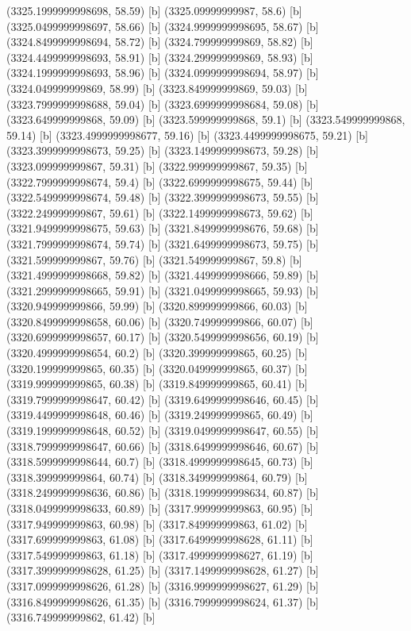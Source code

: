 {{{(3325.1999999998698, 58.59) [b] 
(3325.09999999987, 58.6) [b] 
(3325.0499999998697, 58.66) [b] 
(3324.9999999998695, 58.67) [b] 
(3324.8499999998694, 58.72) [b] 
(3324.799999999869, 58.82) [b] 
(3324.4499999998693, 58.91) [b] 
(3324.299999999869, 58.93) [b] 
(3324.1999999998693, 58.96) [b] 
(3324.0999999998694, 58.97) [b] 
(3324.049999999869, 58.99) [b] 
(3323.849999999869, 59.03) [b] 
(3323.7999999998688, 59.04) [b] 
(3323.6999999998684, 59.08) [b] 
(3323.649999999868, 59.09) [b] 
(3323.599999999868, 59.1) [b] 
(3323.549999999868, 59.14) [b] 
(3323.4999999998677, 59.16) [b] 
(3323.4499999998675, 59.21) [b] 
(3323.3999999998673, 59.25) [b] 
(3323.1499999998673, 59.28) [b] 
(3323.099999999867, 59.31) [b] 
(3322.999999999867, 59.35) [b] 
(3322.7999999998674, 59.4) [b] 
(3322.6999999998675, 59.44) [b] 
(3322.5499999998674, 59.48) [b] 
(3322.3999999998673, 59.55) [b] 
(3322.249999999867, 59.61) [b] 
(3322.1499999998673, 59.62) [b] 
(3321.9499999998675, 59.63) [b] 
(3321.8499999998676, 59.68) [b] 
(3321.7999999998674, 59.74) [b] 
(3321.6499999998673, 59.75) [b] 
(3321.599999999867, 59.76) [b] 
(3321.549999999867, 59.8) [b] 
(3321.4999999998668, 59.82) [b] 
(3321.4499999998666, 59.89) [b] 
(3321.2999999998665, 59.91) [b] 
(3321.0499999998665, 59.93) [b] 
(3320.949999999866, 59.99) [b] 
(3320.899999999866, 60.03) [b] 
(3320.8499999998658, 60.06) [b] 
(3320.749999999866, 60.07) [b] 
(3320.6999999998657, 60.17) [b] 
(3320.5499999998656, 60.19) [b] 
(3320.4999999998654, 60.2) [b] 
(3320.399999999865, 60.25) [b] 
(3320.199999999865, 60.35) [b] 
(3320.049999999865, 60.37) [b] 
(3319.999999999865, 60.38) [b] 
(3319.849999999865, 60.41) [b] 
(3319.7999999998647, 60.42) [b] 
(3319.6499999998646, 60.45) [b] 
(3319.4499999998648, 60.46) [b] 
(3319.249999999865, 60.49) [b] 
(3319.1999999998648, 60.52) [b] 
(3319.0499999998647, 60.55) [b] 
(3318.7999999998647, 60.66) [b] 
(3318.6499999998646, 60.67) [b] 
(3318.5999999998644, 60.7) [b] 
(3318.4999999998645, 60.73) [b] 
(3318.399999999864, 60.74) [b] 
(3318.349999999864, 60.79) [b] 
(3318.2499999998636, 60.86) [b] 
(3318.1999999998634, 60.87) [b] 
(3318.0499999998633, 60.89) [b] 
(3317.999999999863, 60.95) [b] 
(3317.949999999863, 60.98) [b] 
(3317.849999999863, 61.02) [b] 
(3317.699999999863, 61.08) [b] 
(3317.6499999998628, 61.11) [b] 
(3317.549999999863, 61.18) [b] 
(3317.4999999998627, 61.19) [b] 
(3317.3999999998628, 61.25) [b] 
(3317.1499999998628, 61.27) [b] 
(3317.0999999998626, 61.28) [b] 
(3316.9999999998627, 61.29) [b] 
(3316.8499999998626, 61.35) [b] 
(3316.7999999998624, 61.37) [b] 
(3316.749999999862, 61.42) [b] 
}}}
